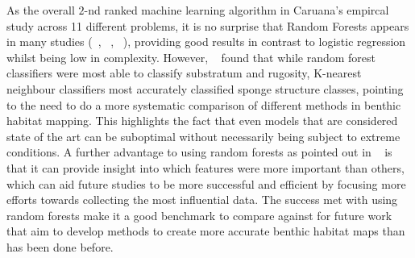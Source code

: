 As the overall $2$-nd ranked machine learning algorithm in Caruana's empircal study across 11 different problems, it is no surprise that Random Forests appears in many studies (~\citet{lucieer13}, ~\citet{seiler12}, ~\citet{hasan14}), providing good results in contrast to logistic regression whilst being low in complexity. However, ~\citet{lucieer13} found that while random forest classifiers were most able to classify substratum and rugosity, K-nearest neighbour classifiers most accurately classified sponge structure classes, pointing to the need to do a more systematic comparison of different methods in benthic habitat mapping. This highlights the fact that even models that are considered state of the art can be suboptimal without necessarily being subject to extreme conditions. A further advantage to using random forests as pointed out in ~\citep{hasan14} is that it can provide insight into which features were more important than others, which can aid future studies to be more successful and efficient by focusing more efforts towards collecting the most influential data. The success met with using random forests make it a good benchmark to compare against for future work that aim to develop methods to create more accurate benthic habitat maps than has been done before.

            


